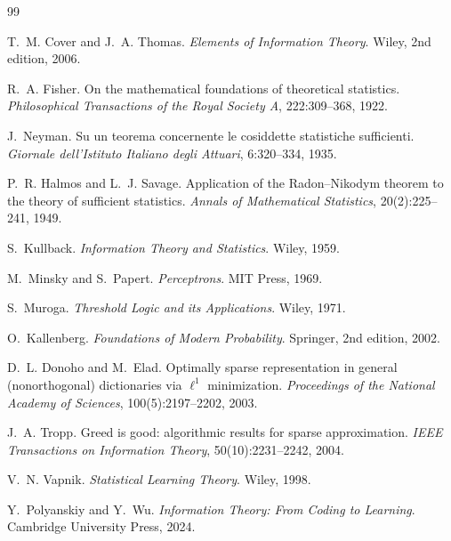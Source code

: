 \documentclass[twocolumn,10pt]{article}
\theoremstyle{definition}
\theoremstyle{remark}
\begin{document}
\clearpage
\begin{thebibliography}{99}

T.~M. Cover and J.~A. Thomas.
\newblock \emph{Elements of Information Theory}.
\newblock Wiley, 2nd edition, 2006.

R.~A. Fisher.
\newblock On the mathematical foundations of theoretical statistics.
\newblock \emph{Philosophical Transactions of the Royal Society A},
222:309--368, 1922.

J.~Neyman.
\newblock Su un teorema concernente le cosiddette statistiche sufficienti.
\newblock \emph{Giornale dell'Istituto Italiano degli Attuari}, 6:320--334,
1935.

P.~R. Halmos and L.~J. Savage.
\newblock Application of the Radon--Nikodym theorem to the theory of
sufficient statistics.
\newblock \emph{Annals of Mathematical Statistics}, 20(2):225--241, 1949.

S.~Kullback.
\newblock \emph{Information Theory and Statistics}.
\newblock Wiley, 1959.

M.~Minsky and S.~Papert.
\newblock \emph{Perceptrons}.
\newblock MIT Press, 1969.

S.~Muroga.
\newblock \emph{Threshold Logic and its Applications}.
\newblock Wiley, 1971.

O.~Kallenberg.
\newblock \emph{Foundations of Modern Probability}.
\newblock Springer, 2nd edition, 2002.

D.~L. Donoho and M.~Elad.
\newblock Optimally sparse representation in general (nonorthogonal)
dictionaries via $\ell^1$ minimization.
\newblock \emph{Proceedings of the National Academy of Sciences},
100(5):2197--2202, 2003.

J.~A. Tropp.
\newblock Greed is good: algorithmic results for sparse approximation.
\newblock \emph{IEEE Transactions on Information Theory},
50(10):2231--2242, 2004.

V.~N. Vapnik.
\newblock \emph{Statistical Learning Theory}.
\newblock Wiley, 1998.

Y.~Polyanskiy and Y.~Wu.
\newblock \emph{Information Theory: From Coding to Learning}.
\newblock Cambridge University Press, 2024.


\end{thebibliography}
\end{document}
